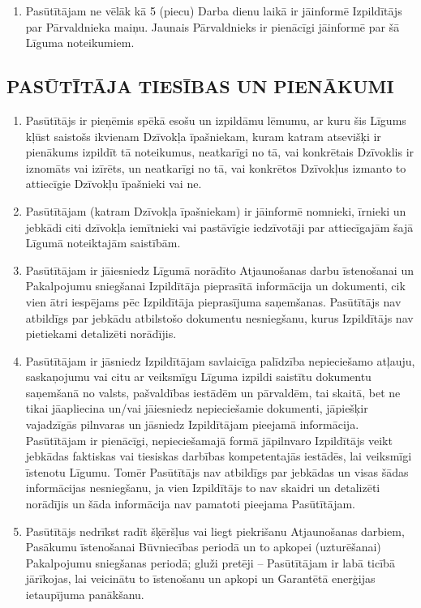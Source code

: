\begin{multicols}{2}
\begin{enumerate}
	\item Pasūtītājam ne vēlāk kā 5 (piecu) Darba dienu laikā ir jāinformē Izpildītājs par Pārvaldnieka maiņu. Jaunais Pārvaldnieks ir pienācīgi jāinformē par šā Līguma noteikumiem.
\end{enumerate}
\subsection{PASŪTĪTĀJA TIESĪBAS UN PIENĀKUMI}
\begin{enumerate}
	\item Pasūtītājs ir pieņēmis spēkā esošu un izpildāmu lēmumu, ar kuru šis Līgums kļūst saistošs ikvienam Dzīvokļa īpašniekam, kuram katram atsevišķi ir pienākums izpildīt tā noteikumus, neatkarīgi no tā, vai konkrētais Dzīvoklis ir iznomāts vai izīrēts, un neatkarīgi no tā, vai konkrētos Dzīvokļus izmanto to attiecīgie Dzīvokļu īpašnieki vai ne.
	\item Pasūtītājam (katram Dzīvokļa īpašniekam) ir jāinformē nomnieki, īrnieki un jebkādi citi dzīvokļa iemītnieki vai pastāvīgie iedzīvotāji par attiecīgajām šajā Līgumā noteiktajām saistībām.
	\item Pasūtītājam ir jāiesniedz Līgumā norādīto Atjaunošanas darbu īstenošanai un Pakalpojumu sniegšanai Izpildītāja pieprasītā informācija un dokumenti, cik vien ātri iespējams pēc  Izpildītāja pieprasījuma saņemšanas. Pasūtītājs nav atbildīgs par jebkādu atbilstošo dokumentu nesniegšanu, kurus Izpildītājs nav pietiekami detalizēti norādījis.
	\item Pasūtītājam ir jāsniedz Izpildītājam savlaicīga palīdzība nepieciešamo atļauju, saskaņojumu vai citu ar veiksmīgu Līguma izpildi saistītu dokumentu saņemšanā no valsts, pašvaldības iestādēm un pārvaldēm, tai skaitā, bet ne tikai jāapliecina un/vai jāiesniedz nepieciešamie dokumenti, jāpiešķir vajadzīgās pilnvaras un jāsniedz Izpildītājam pieejamā informācija. Pasūtītājam ir pienācīgi, nepieciešamajā formā jāpilnvaro Izpildītājs veikt jebkādas faktiskas vai tiesiskas darbības kompetentajās iestādēs, lai veiksmīgi īstenotu Līgumu. Tomēr Pasūtītājs nav atbildīgs par jebkādas un visas šādas informācijas nesniegšanu, ja vien Izpildītājs to nav skaidri un detalizēti norādījis un šāda informācija nav pamatoti pieejama Pasūtītājam.
	\item Pasūtītājs nedrīkst radīt šķēršļus vai liegt piekrišanu Atjaunošanas darbiem, Pasākumu īstenošanai Būvniecības periodā un to apkopei (uzturēšanai) Pakalpojumu sniegšanas periodā; gluži pretēji – Pasūtītājam ir labā ticībā jārīkojas, lai veicinātu to īstenošanu un apkopi un Garantētā enerģijas ietaupījuma panākšanu.

\end{enumerate}
\end{multicols}
